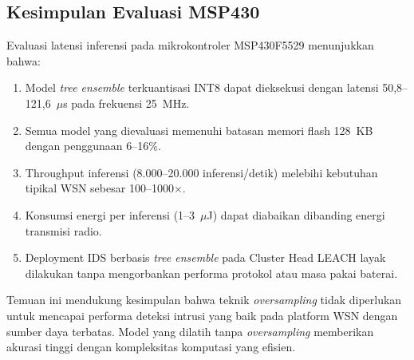 \subsection{Kesimpulan Evaluasi MSP430}

Evaluasi latensi inferensi pada mikrokontroler MSP430F5529 menunjukkan bahwa:

\begin{enumerate}
    \item Model \textit{tree ensemble} terkuantisasi INT8 dapat dieksekusi dengan latensi 50,8--121,6~$\mu$s pada frekuensi 25~MHz.
    
    \item Semua model yang dievaluasi memenuhi batasan memori flash 128~KB dengan penggunaan 6--16\%.
    
    \item Throughput inferensi (8.000--20.000 inferensi/detik) melebihi kebutuhan tipikal WSN sebesar 100--1000$\times$.
    
    \item Konsumsi energi per inferensi (1--3~$\mu$J) dapat diabaikan dibanding energi transmisi radio.
    
    \item Deployment IDS berbasis \textit{tree ensemble} pada Cluster Head LEACH layak dilakukan tanpa mengorbankan performa protokol atau masa pakai baterai.
\end{enumerate}

Temuan ini mendukung kesimpulan bahwa teknik \textit{oversampling} tidak diperlukan untuk mencapai performa deteksi intrusi yang baik pada platform WSN dengan sumber daya terbatas. Model yang dilatih tanpa \textit{oversampling} memberikan akurasi tinggi dengan kompleksitas komputasi yang efisien.

